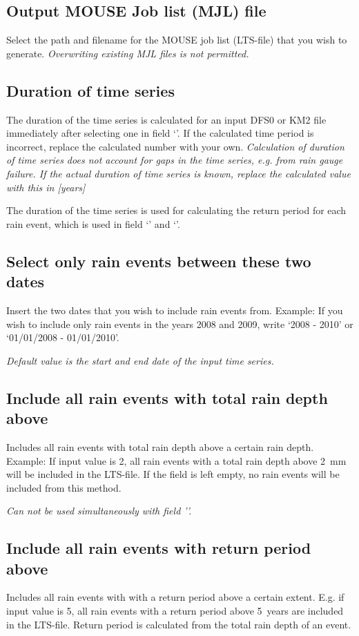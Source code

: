 \documentclass[a4paper,11pt]{refart}
\begin{document}
	\subsection{Output MOUSE Job list (MJL) file}
	Select the path and filename for the MOUSE job list (LTS-file) that you wish to generate. \textit{Overwriting existing MJL files is not permitted.}
	
	\subsection{Duration of time series}
	\label{field3}
	The duration of the time series is calculated for an input DFS0 or KM2 file immediately after selecting one in field `'. If the calculated time period is incorrect, replace the calculated number with your own. \textit{Calculation of duration of time series does not account for gaps in the time series, e.g. from rain gauge failure. If the actual duration of time series is known, replace the calculated value with this in [years]}
	
	The duration of the time series is used for calculating the return period for each rain event, which is used in field `' and `'.
	
	\subsection{Select only rain events between these two dates}
	Insert the two dates that you wish to include rain events from. Example: If you wish to include only rain events in the years 2008 and 2009, write `2008 - 2010' or `01/01/2008 - 01/01/2010'.
	
	\textit{Default value is the start and end date of the input time series.} 
	
	\subsection{Include all rain events with total rain depth above}
			\label{field5}
	Includes all rain events with total rain depth above a certain rain depth. 	Example: If input value is 2, all rain events with a total rain depth above \SI{2}{mm} will be included in the LTS-file. If the field is left empty, no rain events will be included from this method. 
	
	\textit{Can not be used simultaneously with field ''.}
	
	\subsection{Include all rain events with return period above}
		\label{field6}
	Includes all rain events with with a return period above a certain extent. E.g. if input value is 5, all rain events with a return period above \SI{5}{years} are included in the LTS-file. Return period is calculated from the total rain depth of an event. 
	
\end{document}
